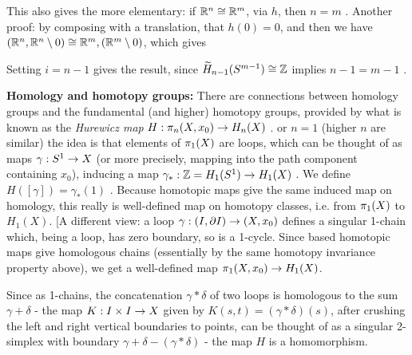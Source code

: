 \msk

This also gives the more elementary: if ${\Bbb R}^n\cong {\Bbb R}^m$, via $h$, then $n=m$ .
Another proof: by composing with a translation, that $h(0)=0$, and then we have 
$({\Bbb R}^n,{\Bbb R}^n\setminus 0)\cong {\Bbb R}^m,({\Bbb R}^m\setminus 0)$, which gives


\ssk



\ssk

Setting $i=n-1$ gives the result, since $\widetilde{H}_{n-1}(S^{m-1})\cong {\Bbb Z}$ implies $n-1=m-1$ .

\msk

{\bf Homology and homotopy groups:} There are connections between homology groups and
the fundamental (and higher) homotopy groups, provided by what is known as the
{\it Hurewicz map} $H:\pi_n(X,x_0)\rightarrow H_n(X)$ . or $n=1$ (higher $n$ are similar)
the idea is that elements of $\pi_1(X)$ are loops, which can be thought of as maps
$\gamma:S^1\rightarrow X$ (or more precisely, mapping into the path component containing 
$x_0$), inducing a map $\gamma_*:{\Bbb Z} = H_1(S^1)\rightarrow H_1(X)$ . 
We define $H([\gamma])=\gamma_*(1)$ . Because homotopic maps give the same induced
map on homology, this really is well-defined map on homotopy
classes, i.e. from $\pi_1(X)$ to $H_1(X)$. [A different view: 
a loop $\gamma:(I,\partial I)\rightarrow (X,x_0)$ defines a singular 1-chain which, being a loop,
has zero boundary, so is a 1-cycle. Since based homotopic maps give homologous
chains (essentially by the same homotopy invariance property above), we get a 
well-defined map $\pi_1(X,x_0)\rightarrow H_1(X)$.

Since as 1-chains, the concatenation $\gamma*\delta$ of two loops is homologous
to the sum $\gamma+\delta$ - the map $K:I\times I\rightarrow X$ given by $K(s,t)=(\gamma*\delta)(s)$,
after crushing the left and right vertical boundaries to points, can be thought of as
a singular 2-simplex with boundary $\gamma + \delta - (\gamma*\delta)$ - the map 
$H$ is a homomorphism.

\msk

